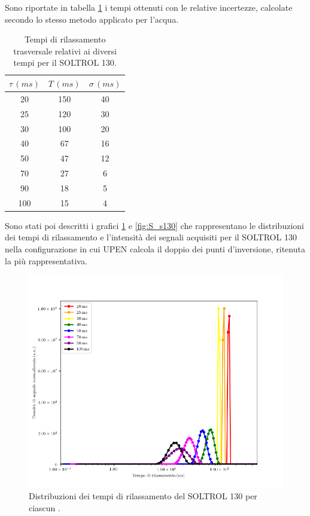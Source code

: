 Sono riportate in tabella \ref{tab:T_s130} i tempi ottenuti con le relative incertezze, calcolate secondo lo stesso metodo applicato per l'acqua.

\begin{table}[h!]
    \begin{center}
    \begin{tabular}{c c c}
    \toprule
    	${\tau}\,(ms)$ & $T\,(ms)$ & ${\sigma}\,(ms)$ \\
    \midrule
	 20 & 150 & 40 \\
	 25 & 120 & 30 \\
	 30 & 100 & 20 \\
	 40 & 67 & 16 \\
	 50 & 47 & 12 \\
	 70 & 27 & 6 \\
	 90 & 18 & 5 \\
	 100 & 15 & 4 \\
    \bottomrule
    \end{tabular}
    \caption{Tempi di rilassamento trasversale relativi ai diversi tempi \tau per il SOLTROL 130.}
    \label{tab:T_s130}
    \end{center}
\end{table}

Sono stati poi descritti i grafici \ref{fig:D_s130} e \ref{fig:S_s130} che rappresentano le distribuzioni dei tempi di rilassamento e l'intensità dei segnali acquisiti per il SOLTROL 130 nella configurazione in cui UPEN calcola il doppio dei punti d'inversione, ritenuta la più rappresentativa.

\begin{figure}[h!]
\centering
\includegraphics[scale=0.3]{Figure/SOLTROL130.png}
\caption{Distribuzioni dei tempi di rilassamento del SOLTROL 130 per ciascun \tau.}
\label{fig:D_s130}
\end{figure}

